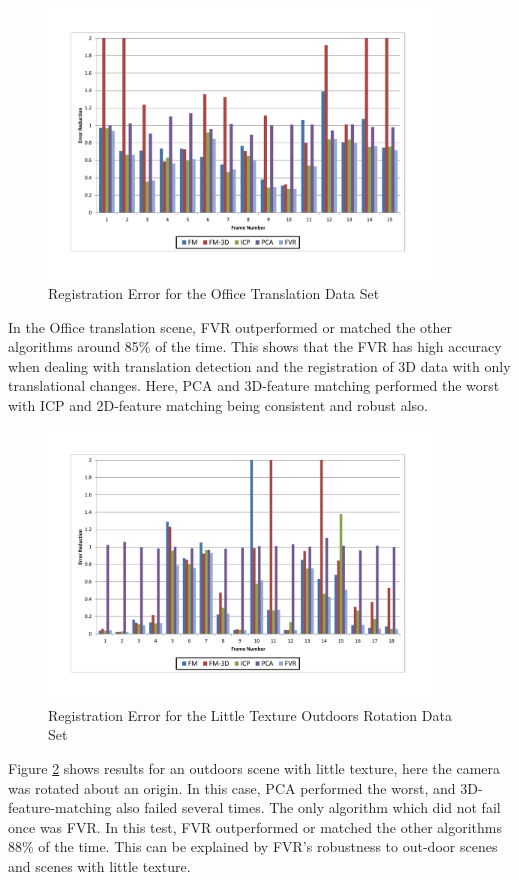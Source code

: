 \begin{figure}[!htb]
\centering
\includegraphics[width=4.0in]{images/results/Office_Texture_Translation}
\caption{Registration Error for the Office Translation Data Set}
\label{fig:PET12}
\end{figure}

In the Office translation scene, FVR outperformed or matched the other algorithms around 85\% of the time. This shows that the FVR has high accuracy when dealing with translation detection and the registration of 3D data with only translational changes. Here, PCA and 3D-feature matching performed the worst with ICP and 2D-feature matching being consistent and robust also. \\

\begin{figure}[!htb]
\centering
\includegraphics[width=4.0in]{images/results/Outside_No_Texture_Rotation}
\caption{Registration Error for the Little Texture Outdoors Rotation Data Set}
\label{fig:PET13}
\end{figure}

Figure \ref{fig:PET13} shows results for an outdoors scene with little texture, here the camera was rotated about an origin. In this case, PCA performed the worst, and 3D-feature-matching also failed several times. The only algorithm which did not fail once was FVR. In this test, FVR outperformed or matched the other algorithms 88\% of the time. This can be explained by FVR's robustness to out-door scenes and scenes with little texture.  \\

